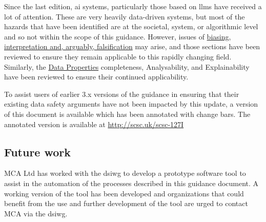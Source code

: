 Since the last edition, \gls{ai} systems, particularly those based on
\glspl{llm} have received a
lot of attention.
These are very heavily data-driven systems, but most of the hazards that have been identified are
at the societal, system, or algorithmic level and so not within the scope of this guidance.
However, issues of  \hyperref[tab:issues]{biasing, interpretation and, arguably, falsification}
may arise, and those sections have been reviewed to ensure they remain applicable to this rapidly
changing field.
Similarly, the \hyperref[bkm:guidance:dataproperties]{Data Properties}
\gls{completeness}, Analysability,
and Explainability have been reviewed to ensure their continued
applicability.

To assist users of earlier 3.x versions of the guidance in ensuring that their existing data safety arguments have not been impacted by this update, a version of this document is available which has been annotated with change bars. The annotated version is available at \href{http://scsc.uk/scsc-127I}{http://scsc.uk/scsc-127I}


\subsection*{Future work}

MCA Ltd has worked with the \gls{dsiwg} to develop a prototype software tool to assist in the automation of the processes described in this guidance document.
A working version of the tool has been developed and organizations that could benefit from the use and further development of the tool are urged to contact MCA via the \gls{dsiwg}.

